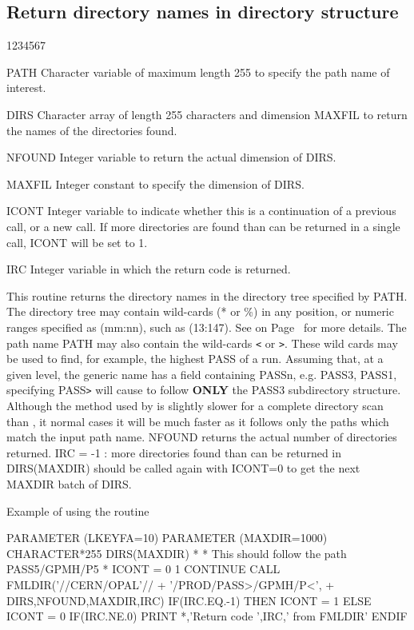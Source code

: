 \subsection{Return directory names in directory structure}
\begin{DLtt}{1234567}
\item[PATH]
Character variable of maximum length 255 to specify the path name of
interest.
\item[DIRS ]
Character array of length 255 characters and dimension MAXFIL
to return the names of the directories found.
\item[NFOUND]
Integer variable to return the actual dimension of DIRS.
\item[MAXFIL]
Integer constant to specify the dimension of DIRS.
\item[ICONT]
Integer variable to indicate whether this is a continuation
of a previous call, or a new call.
If more directories are found than can be returned in a single
call, ICONT will be set to 1.
\item[IRC]
Integer variable in which the return code is returned.
\end{DLtt}
\par
This routine returns the directory names
in the directory tree specified by PATH.
The directory tree may contain wild-cards (* or \%) in any position,
or numeric ranges specified as (mm:nn), such as (13:147).
See on Page~\pageref{FMATCH} for more details.
The path name
PATH may also contain the wild-cards {\tt<} or {\tt>}. These wild cards
may be used to find, for example, the highest PASS of a run.
Assuming that, at a given level, the generic name has a field
containing PASSn, e.g. PASS3, PASS1, specifying PASS{\tt>} will
cause  to follow {\bf ONLY} the PASS3 subdirectory
structure. Although the method used by  is slightly slower
for a complete directory scan than , it normal cases
it will be much faster as it follows only the paths which match
the input path name.
NFOUND returns the actual number of directories returned.
IRC = -1 : more directories found than can be returned in DIRS(MAXDIR)
 should be called again with ICONT=0 to get the next MAXDIR
batch of DIRS.
\begin{XMPt}{Example of using the \protect{} routine}

      PARAMETER     (LKEYFA=10)
      PARAMETER     (MAXDIR=1000)
      CHARACTER*255 DIRS(MAXDIR)
*
*     This should follow the path PASS5/GPMH/P5
*
      ICONT = 0
 1    CONTINUE
      CALL FMLDIR('//CERN/OPAL'//
     +            '/PROD/PASS>/GPMH/P<',
     +            DIRS,NFOUND,MAXDIR,IRC)
      IF(IRC.EQ.-1) THEN
         ICONT = 1
      ELSE
         ICONT = 0
         IF(IRC.NE.0) PRINT *,'Return code ',IRC,' from FMLDIR'
      ENDIF
\end{XMPt}


